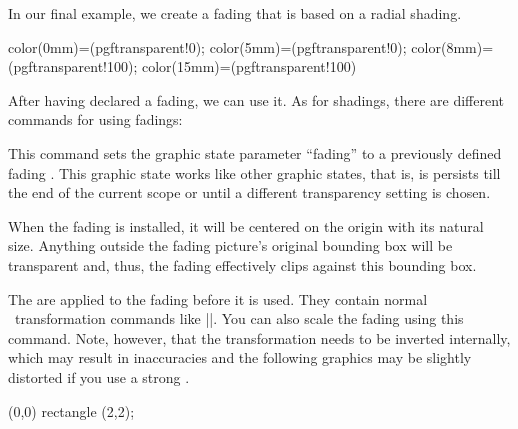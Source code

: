 \begin{command}{\pgfdeclarefading{}}
  In our final example, we create a fading that is based on a radial
  shading.
\begin{codeexample}[]
{
  color(0mm)=(pgftransparent!0);
  color(5mm)=(pgftransparent!0);
  color(8mm)=(pgftransparent!100);
  color(15mm)=(pgftransparent!100)
}
\end{codeexample}
\end{command}

After having declared a fading, we can use it. As for shadings, there
are different commands for using fadings:

\begin{command}{\pgfsetfading{}}
  This command sets the graphic state parameter ``fading'' to a
  previously defined fading . This graphic state works like
  other graphic states, that is, is persists till the end of the
  current scope or until a different transparency setting is chosen.

  When the fading is installed, it will be centered on the origin with
  its natural size. Anything outside the fading picture's original
  bounding box will be transparent and, thus, the fading effectively
  clips against this bounding box.

  The  are applied to the fading before it is
  used. They contain normal \pgfname\ transformation commands like
  |\pgftransformshift|. You can also scale the fading using this
  command. Note, however, that the transformation needs to be inverted
  internally, which may result in inaccuracies and the following
  graphics may be slightly distorted if you use a strong
  .
\begin{codeexample}[]
{\tikz \shade[left color=pgftransparent!0,
              right color=pgftransparent!100] (0,0) rectangle (2,2);}
\end{codeexample}
\begin{codeexample}[]
\end{codeexample}
\end{command}


